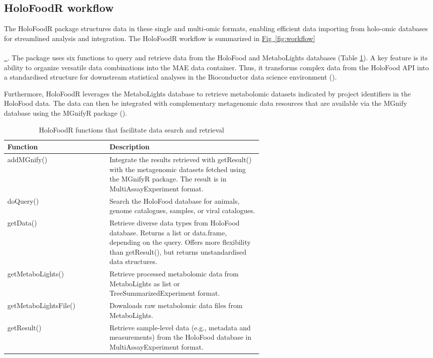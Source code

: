 \documentclass[unnumsec,webpdf,namedate,modern,large]{oup-authoring-template}%
\newcommand*{\figref}[2][]{%
  \hyperref[{fig:#2}]{%
    Fig~\ref*{fig:#2}%
    \ifx\\#1\\%
    \else
      \,#1%
    \fi
  }%
}
\begin{document}
\vspace{-1em}
\subsection{HoloFoodR workflow}

The HoloFoodR package structures data in these single and multi-omic formats, enabling efficient data importing from holo-omic databases for streamlined analysis and integration. The HoloFoodR workflow is summarized in \figref{workflow}. The package uses six functions to query and retrieve data from the HoloFood and MetaboLights databases (Table \ref{tab:holofoodr_functions}). A key feature is its ability to organize versatile data combinations into the MAE data container. Thus, it transforms complex data from the HoloFood API into a standardised structure for downstream statistical analyses in the Bioconductor data science environment  (\cite{ramos_software_2017}).

Furthermore, HoloFoodR leverages the MetaboLights database to retrieve metabolomic datasets indicated by project identifiers in the HoloFood data. The data can then be integrated with complementary metagenomic data resources that are available via the MGnify database using the MGnifyR package (\cite{mgnifyr}).

\vspace{-1em}

\begin{table}[H]
\begin{center}
\begin{minipage}{\linewidth}
\caption{HoloFoodR functions that facilitate data search and retrieval}\label{tab:holofoodr_functions}
    \begin{tabular}{l p{0.6\linewidth}}
        \toprule
        Function & Description \\
        \midrule
        addMGnify() & Integrate the results retrieved with getResult() with the metagenomic datasets fetched using the MGnifyR package. The result is in MultiAssayExperiment format. \\
        doQuery() & Search the HoloFood database for animals, genome catalogues, samples, or viral catalogues. \\
        getData() & Retrieve diverse data types from HoloFood database. Returns a list or data.frame, depending on the query. Offers more flexibility than getResult(), but returns unstandardised data structures. \\
        getMetaboLights() & Retrieve processed metabolomic data from MetaboLights as list or TreeSummarizedExperiment format. \\
        getMetaboLightsFile() & Downloads raw metabolomic data files from MetaboLights. \\
        getResult()  & Retrieve sample-level data (e.g., metadata and measurements) from the HoloFood database in MultiAssayExperiment format. \\
        \bottomrule
    \end{tabular}
\end{minipage}
\end{center}
\end{table}
\end{document}
